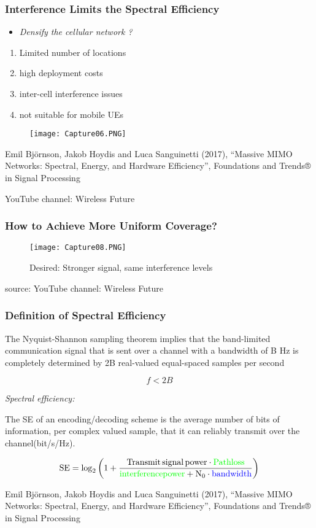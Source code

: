 \documentclass{beamer}
\begin{document}
\begin{frame}[fragile=singleslide]\frametitle{Interference Limits the Spectral Efficiency}
\begin{itemize}
\item \textit{Densify the cellular network ?}
\end{itemize}
\begin{enumerate}
\item Limited number of locations
\item high deployment costs 
\item inter-cell interference issues
\item not suitable for mobile UEs
\end{enumerate}
\begin{figure}
  \texttt{[image: Capture06.PNG]}
\end{figure}
\tiny Emil Björnson, Jakob Hoydis and Luca Sanguinetti (2017), “Massive MIMO Networks: Spectral, Energy, and Hardware Efficiency”, Foundations and Trends® in Signal Processing

\tiny YouTube channel: Wireless Future
\end{frame}


\begin{frame}[fragile=singleslide]\frametitle{How to Achieve More Uniform Coverage?}
\begin{figure}
  \texttt{[image: Capture08.PNG]}
\caption{Desired: Stronger signal, same interference levels} 
\end{figure}
\tiny source: YouTube channel: Wireless Future
\end{frame}

\begin{frame}[fragile=singleslide]\frametitle{Definition of Spectral Efficiency}
The Nyquist-Shannon sampling theorem implies that the band-limited communication signal that is sent over a channel with a bandwidth of B Hz is completely determined by 2B real-valued equal-spaced samples per second

$$f < 2B$$ %

\textit{Spectral efficiency:}

The SE of an encoding/decoding scheme is the average number of bits of information, per complex valued sample, that it can reliably transmit over the channel(bit/s/Hz).

$$\mathrm{ SE = \log_{2}\left(1+\frac{Transmit\, signal\, power \cdot \textcolor{green}{Pathloss}}{\textcolor{green}{interference power} + N_{0} \cdot \textcolor{blue}{bandwidth}}\right) }$$ %

\vspace{0.4cm}

\tiny Emil Björnson, Jakob Hoydis and Luca Sanguinetti (2017), “Massive MIMO Networks: Spectral, Energy, and Hardware Efficiency”, Foundations and Trends® in Signal Processing
\end{frame}
\end{document}
